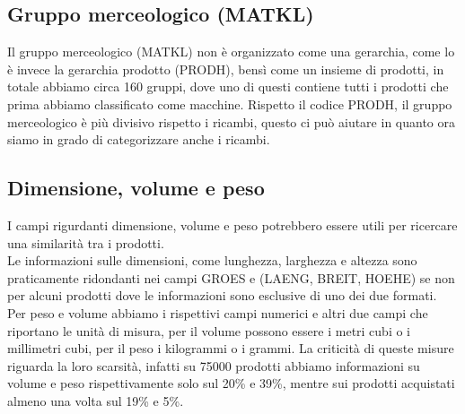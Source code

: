 \subsection{Gruppo merceologico (MATKL)}
Il gruppo merceologico (MATKL) non è organizzato come una gerarchia, come lo è invece la gerarchia prodotto (PRODH), bensì come un insieme di prodotti, in totale abbiamo circa 160 gruppi, dove uno di questi contiene tutti i prodotti che prima abbiamo classificato come macchine. Rispetto il codice PRODH, il gruppo merceologico è più divisivo rispetto i ricambi, questo ci può aiutare in quanto ora siamo in grado di categorizzare anche i ricambi. 

\subsection{Dimensione, volume e peso}
I campi rigurdanti dimensione, volume e peso potrebbero essere utili per ricercare una similarità tra i prodotti.\\
Le informazioni sulle dimensioni, come lunghezza, larghezza e altezza sono praticamente ridondanti nei campi GROES e (LAENG, BREIT, HOEHE) se non per alcuni prodotti dove le informazioni sono esclusive di uno dei due formati.\\
Per peso e volume abbiamo i rispettivi campi numerici e altri due campi che riportano le unità di misura, per il volume possono essere i metri cubi o i millimetri cubi, per il peso i kilogrammi o i grammi.
La criticità di queste misure riguarda la loro scarsità, infatti su 75000 prodotti abbiamo informazioni su volume e peso rispettivamente solo sul 20\% e 39\%, mentre sui prodotti acquistati almeno una volta sul 19\% e 5\%. 
